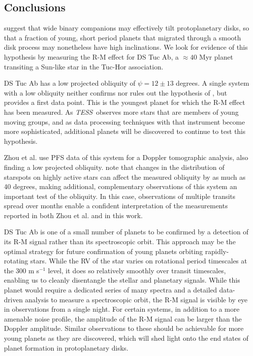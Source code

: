 \documentclass[twocolumn]{aastex63}
\newcommand{\tess}{{\it TESS}}
\begin{document}
\subsection{Conclusions}

\citet{Batygin12} suggest that wide binary companions may effectively tilt protoplanetary disks, so that a fraction of young, short period planets that migrated through a smooth disk process may nonetheless have high inclinations. 
We look for evidence of this hypothesis by measuring the R-M effect for DS Tuc Ab, a $\approx 40$ Myr planet transiting a Sun-like star in the Tuc-Hor association. 

DS Tuc Ab has a low projected obliquity of $\psi = 12 \pm 13$ degrees. A single system with a low obliquity neither confirms nor rules out the hypothesis of \citet{Batygin12}, but provides a first data point.
This is the youngest planet for which the R-M effect has been measured. As \tess\ observes more stars that are members of young moving groups, and as data processing techniques with that instrument become more sophisticated, additional planets will be discovered to continue to test this hypothesis.

Zhou et al. use PFS data of this system for a Doppler tomographic analysis, also finding a low projected obliquity. \citet{Oshagh12} note that changes in the distribution of starspots on highly active stars can affect the measured obliquity by as much as 40 degrees, making additional, complementary observations of this system an important test of the obliquity. 
In this case, observations of multiple transits spread over months enable a confident interpretation of the measurements reported in both Zhou et al. and in this work.

DS Tuc Ab is one of a small number of planets to be confirmed by a detection of its R-M signal rather than its spectroscopic orbit. 
This approach may be the optimal strategy for future confirmation of young planets orbiting rapidly-rotating stars. 
While the RV of the star varies on rotational period timescales at the 300 m s$^{-1}$ level, it does so relatively smoothly over transit timescales, enabling us to cleanly disentangle the stellar and planetary signals.
While this planet would require a dedicated series of many spectra and a detailed data-driven analysis to measure a spectroscopic orbit, the R-M signal is visible by eye in observations from a single night.
For certain systems, in addition to a more amenable noise profile, the amplitude of the R-M signal can be larger than the Doppler amplitude. 
Similar observations to these should be achievable for more young planets as they are discovered, which will shed light onto the end states of planet formation in protoplanetary disks.
\end{document}
